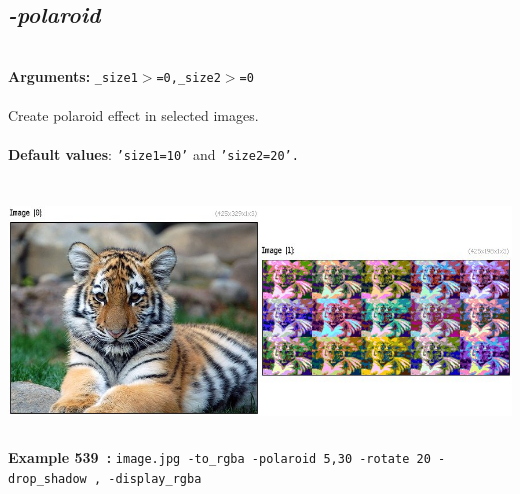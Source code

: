 \documentclass[a4paper,11pt,twoside]{book}
\begin{document}
\subsection{\emph{-polaroid} }\vspace*{-0.5em}
~\\\textbf{Arguments: } 
{\small \texttt{\_size1$>$=0,\_size2$>$=0}}\\~\\
Create polaroid effect in selected images.
~\\~\\\textbf{Default values}: {\small \texttt{'size1=10'} and \texttt{'size2=20'.}}
\begin{center}\includegraphics[keepaspectratio=true,height=7cm,width=\textwidth]{img/gmic_def539.jpg}\\
{\footnotesize \textbf{Example 539~:} \texttt{image.jpg -to\_rgba -polaroid 5,30 -rotate 20 -drop\_shadow , -display\_rgba}}
\end{center}
\end{document}

